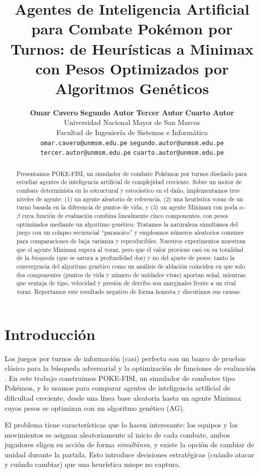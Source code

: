 \documentclass[11pt]{article}
\title{Agentes de Inteligencia Artificial para Combate Pokémon por Turnos: de Heurísticas a Minimax con Pesos Optimizados por Algoritmos Genéticos}
\author{
  \textbf{Omar Cavero} \quad \textbf{Segundo Autor} \quad
  \textbf{Tercer Autor} \quad \textbf{Cuarto Autor} \\
  Universidad Nacional Mayor de San Marcos \\
  Facultad de Ingeniería de Sistemas e Informática \\[2pt]
  {\small
  \texttt{omar.cavero@unmsm.edu.pe} \quad
  \texttt{segundo.autor@unmsm.edu.pe} \\
  \texttt{tercer.autor@unmsm.edu.pe} \quad
  \texttt{cuarto.autor@unmsm.edu.pe}}
}
\begin{document}
\maketitle

\begin{abstract}
Presentamos POKE-FISI, un simulador de combate Pokémon por turnos diseñado para
estudiar agentes de inteligencia artificial de complejidad creciente. Sobre un
motor de combate determinista en lo estructural y estocástico en el daño,
implementamos tres niveles de agente: (1) un agente aleatorio de referencia,
(2) una heurística voraz de un turno basada en la diferencia de puntos de vida, y
(3) un agente Minimax con poda $\alpha$-$\beta$ cuya función de evaluación combina
linealmente cinco componentes, con pesos optimizados mediante un algoritmo
genético. Tratamos la naturaleza simultánea del juego con un colapso secuencial
``paranoico'' y empleamos números aleatorios comunes para comparaciones de baja
varianza y reproducibles. Nuestros experimentos muestran que el agente Minimax
supera al voraz, pero que el valor proviene casi en su totalidad de la
\emph{búsqueda} (que se satura a profundidad dos) y no del ajuste de pesos: tanto
la convergencia del algoritmo genético como un análisis de ablación coinciden en
que solo dos componentes (puntos de vida y número de unidades vivas) aportan
señal, mientras que ventaja de tipo, velocidad y presión de derribo son
marginales frente a un rival voraz. Reportamos este resultado negativo de forma
honesta y discutimos sus causas.
\end{abstract}

\section{Introducción}

Los juegos por turnos de información (casi) perfecta son un banco de pruebas
clásico para la búsqueda adversarial y la optimización de funciones de
evaluación \citep{shannon1950,russell2010}. En este trabajo construimos
POKE-FISI, un simulador de combates tipo Pokémon, y lo usamos para comparar
agentes de inteligencia artificial de dificultad creciente, desde una línea base
aleatoria hasta un agente Minimax cuyos pesos se optimizan con un algoritmo
genético (AG).

El problema tiene características que lo hacen interesante: los equipos y los
movimientos se asignan aleatoriamente al inicio de cada combate, ambos
jugadores eligen su acción de forma \emph{simultánea}, y existe la opción de
cambiar de unidad durante la partida. Esto introduce decisiones estratégicas
(cuándo atacar y cuándo cambiar) que una heurística miope no captura.
\end{document}
